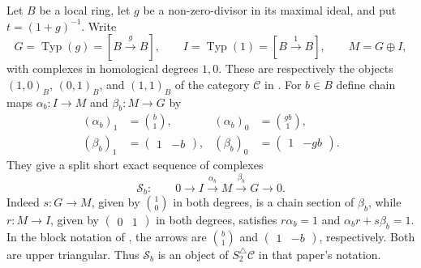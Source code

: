 \documentclass[11pt,a4paper]{amsart}
\numberwithin{equation}{section}
\theoremstyle{definition}
\theoremstyle{remark}
\begin{document}
Let $B$ be a local ring, let $g$ be a non-zero-divisor in its maximal
ideal, and put $t=(1+g)^{-1}$. Write
\[
G=\operatorname{Typ}(g)=[B\xrightarrow{g}B],\qquad
I=\operatorname{Typ}(1)=[B\xrightarrow{1}B],\qquad M=G\oplus I,
\]
with complexes in homological degrees $1,0$. These are respectively
the objects $(1,0)_B$, $(0,1)_B$, and $(1,1)_B$ of the category $\mathcal C$
in \cite[Definition~9]{MochizukiParameters}. For $b\in B$ define
chain maps $\alpha_b:I\to M$ and $\beta_b:M\to G$ by
\begin{align*}
(\alpha_b)_1&=\binom{b}{1},&
(\alpha_b)_0&=\binom{gb}{1},\\
(\beta_b)_1&=\begin{pmatrix}1&-b\end{pmatrix},&
(\beta_b)_0&=\begin{pmatrix}1&-gb\end{pmatrix}.
\end{align*}
They give a split short exact sequence of complexes
\[
\mathcal S_b:\qquad 0\longrightarrow I\xrightarrow{\alpha_b}
M\xrightarrow{\beta_b}G\longrightarrow0.
\]
Indeed $s:G\to M$, given by $\binom10$ in both degrees, is a
chain section of $\beta_b$, while $r:M\to I$, given by
$\begin{pmatrix}0&1\end{pmatrix}$ in both degrees, satisfies
$r\alpha_b=1$ and $\alpha_b r+s\beta_b=1$. In the block notation
of \cite[Conventions~11]{MochizukiParameters}, the arrows are
$\binom b1$ and $\begin{pmatrix}1&-b\end{pmatrix}$, respectively.
Both are upper triangular. Thus $\mathcal S_b$ is an object of
$S_2^{\triangle}\mathcal C$ in that paper's notation.
\end{document}
